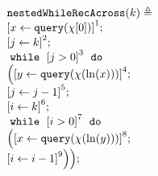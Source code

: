                     \begin{example}
                        \[
                        \begin{array}{l}
                            \kw{nestedWhileRecAcross}(k) \triangleq \\
                            \clabel{ \assign{x}{\query(\chi[0])}}^{1} ; \\
                            \clabel{\assign{j}{k} }^{2} ; \\
                                \ewhile ~ \clabel{j > 0}^{3} ~ \edo ~ \\
                                \Big(
                                 \clabel{\assign{y}{\query(\chi(\ln(x)))} }^{4}  ; \\
                                 \clabel{\assign{j}{j-1}}^{5} ;\\
                                 \clabel{\assign{i}{k}}^{6} ;\\
                                 \ewhile ~ \clabel{i > 0}^{7} ~ \edo ~ \\
                                 \Big(
                                  \clabel{\assign{x}{\query(\chi(\ln(y)))} }^{8}  ; \\
                                  \clabel{\assign{i}{i-1}}^{9}
                                  \Big) \Big);
                            \end{array}
                        \]
                        \end{example}
            
